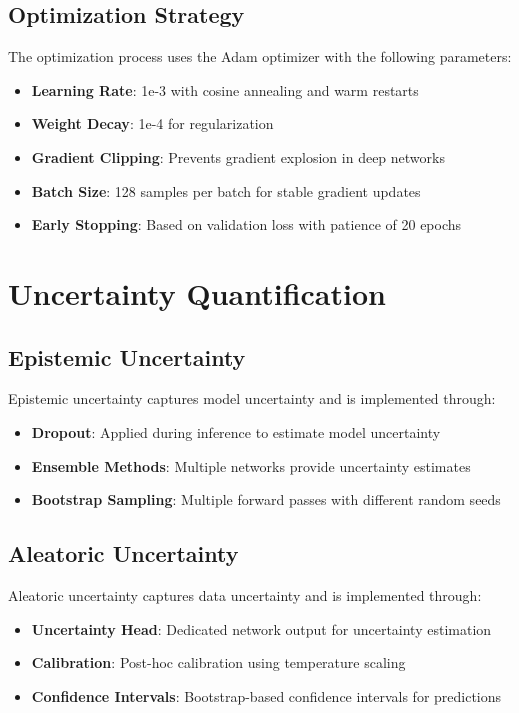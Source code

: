 \documentclass[conference]{IEEEtran}
\begin{document}
\subsection{Optimization Strategy}

The optimization process uses the Adam optimizer with the following parameters:

\begin{itemize}
    \item \textbf{Learning Rate}: 1e-3 with cosine annealing and warm restarts
    \item \textbf{Weight Decay}: 1e-4 for regularization
    \item \textbf{Gradient Clipping}: Prevents gradient explosion in deep networks
    \item \textbf{Batch Size}: 128 samples per batch for stable gradient updates
    \item \textbf{Early Stopping}: Based on validation loss with patience of 20 epochs
\end{itemize}

\section{Uncertainty Quantification}

\subsection{Epistemic Uncertainty}

Epistemic uncertainty captures model uncertainty and is implemented through:

\begin{itemize}
    \item \textbf{Dropout}: Applied during inference to estimate model uncertainty
    \item \textbf{Ensemble Methods}: Multiple networks provide uncertainty estimates
    \item \textbf{Bootstrap Sampling}: Multiple forward passes with different random seeds
\end{itemize}

\subsection{Aleatoric Uncertainty}

Aleatoric uncertainty captures data uncertainty and is implemented through:

\begin{itemize}
    \item \textbf{Uncertainty Head}: Dedicated network output for uncertainty estimation
    \item \textbf{Calibration}: Post-hoc calibration using temperature scaling
    \item \textbf{Confidence Intervals}: Bootstrap-based confidence intervals for predictions
\end{itemize}
\end{document}
